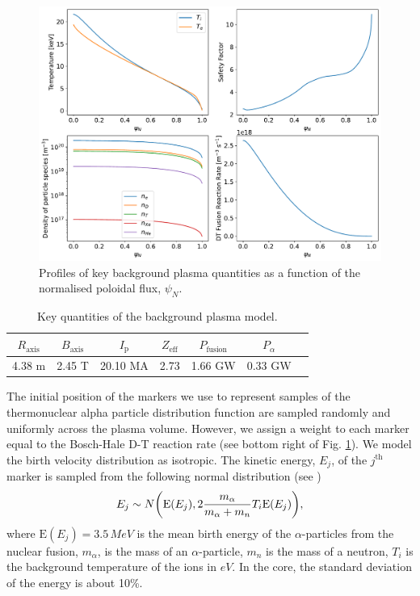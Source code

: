 \documentclass[10pt, a4paper, twoside]{article}
\begin{document}
\begin{figure}[!ht]
    \centering
    \includegraphics[width=0.99\linewidth]{Figures/background_plasma_curves.pdf}
    \caption{Profiles of key background plasma quantities as a function of the normalised poloidal flux, $\psi_N$.}
    \label{fig:background_plasma_profiles}
\end{figure}

\begin{table}[htbp]
\centering
\begin{tabular}{ccccccc}
\hline
$R_{\text{axis}}$ & $B_{\text{axis}}$ & $I_{\text{p}}$ & $Z_{\text{eff}}$ & $P_{\text{fusion}}$ & $P_{\alpha}$ \\
\hline
4.38 m & 2.45 T & 20.10 MA & 2.73 & 1.66 GW & 0.33 GW \\
\hline
\end{tabular}
\caption{Key quantities of the background plasma model.}
\label{table:fusion_params}
\end{table}

The initial position of the markers we use to represent samples of the thermonuclear alpha particle distribution function are sampled randomly and uniformly across the plasma volume. However, we assign a weight to each marker equal to the Bosch-Hale D-T reaction rate (see bottom right of Fig. \ref{fig:background_plasma_profiles}). We model the birth velocity distribution as isotropic. The kinetic energy, $E_j$, of the $j^{\text{th}}$ marker is sampled from the following normal distribution (see \cite{brysk1973})
\begin{equation}
    E_j \sim N\qty(\text{E}(E_j), 2\frac{m_\alpha}{m_\alpha + m_n} T_i\text{E}(E_j) ),
\end{equation}
where $\text{E}(E_j)=3.5\, \si{MeV}$ is the mean birth energy of the $\alpha$-particles from the nuclear fusion, $m_\alpha$, is the mass of an $\alpha$-particle, $m_n$ is the mass of a neutron, $T_i$ is the background temperature of the ions in $\si{eV}$. In the core, the standard deviation of the energy is about 10\%.
\end{document}
